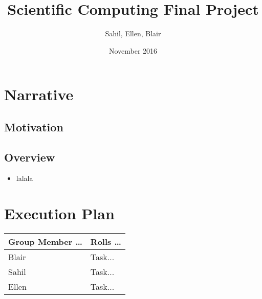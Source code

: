 \documentclass{article}
\title{Scientific Computing Final Project}
\author{Sahil, Ellen, Blair}
\date{November 2016}
\begin{document}
\maketitle

\section{Narrative}


\subsection{Motivation}
\begin{itemize}

\end{itemize}

\subsection{Overview}

\begin{itemize}
    \item lalala

\end{itemize}

\section{Execution Plan}
\begin{tabular}{p{4cm}|p{7.5cm}}
     \large{Group Member \ldots} & \large{Rolls \ldots} \\ \hline \hline
     Blair & Task... \\  \hline 
     Sahil & Task... \\ \hline
     Ellen & Task... \\ \hline

\end{tabular}
\end{document}
